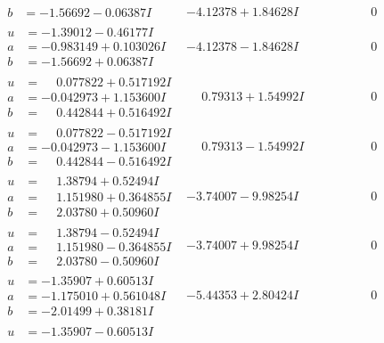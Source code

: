 \documentclass[1p]{elsarticle_modified}
\theoremstyle{definition}
\begin{document}
$$\begin{array}{c|c|c}
\begin{aligned}
b &= -1.56692 - 0.06387 I\end{aligned}
 & -4.12378 + 1.84628 I & \phantom{-0.000000 } 0 \\ \hline\begin{aligned}
u &= -1.39012 - 0.46177 I \\
a &= -0.983149 + 0.103026 I \\
b &= -1.56692 + 0.06387 I\end{aligned}
 & -4.12378 - 1.84628 I & \phantom{-0.000000 } 0 \\ \hline\begin{aligned}
u &= \phantom{-}0.077822 + 0.517192 I \\
a &= -0.042973 + 1.153600 I \\
b &= \phantom{-}0.442844 + 0.516492 I\end{aligned}
 & \phantom{-}0.79313 + 1.54992 I & \phantom{-0.000000 } 0 \\ \hline\begin{aligned}
u &= \phantom{-}0.077822 - 0.517192 I \\
a &= -0.042973 - 1.153600 I \\
b &= \phantom{-}0.442844 - 0.516492 I\end{aligned}
 & \phantom{-}0.79313 - 1.54992 I & \phantom{-0.000000 } 0 \\ \hline\begin{aligned}
u &= \phantom{-}1.38794 + 0.52494 I \\
a &= \phantom{-}1.151980 + 0.364855 I \\
b &= \phantom{-}2.03780 + 0.50960 I\end{aligned}
 & -3.74007 - 9.98254 I & \phantom{-0.000000 } 0 \\ \hline\begin{aligned}
u &= \phantom{-}1.38794 - 0.52494 I \\
a &= \phantom{-}1.151980 - 0.364855 I \\
b &= \phantom{-}2.03780 - 0.50960 I\end{aligned}
 & -3.74007 + 9.98254 I & \phantom{-0.000000 } 0 \\ \hline\begin{aligned}
u &= -1.35907 + 0.60513 I \\
a &= -1.175010 + 0.561048 I \\
b &= -2.01499 + 0.38181 I\end{aligned}
 & -5.44353 + 2.80424 I & \phantom{-0.000000 } 0 \\ \hline\begin{aligned}
u &= -1.35907 - 0.60513 I \\

\end{aligned}
\end{array}$$
\end{document}

